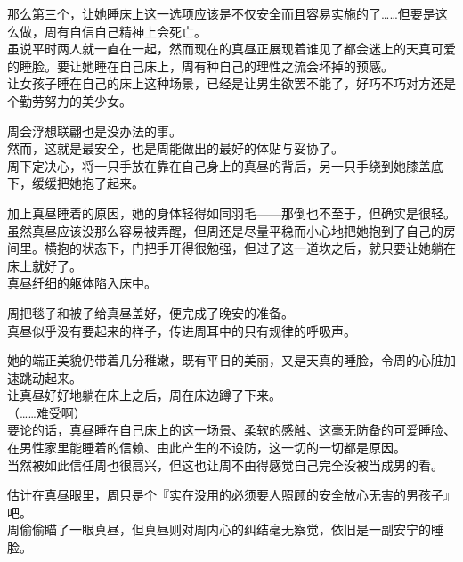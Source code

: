 那么第三个，让她睡床上这一选项应该是不仅安全而且容易实施的了……但要是这么做，周有自信自己精神上会死亡。\\

虽说平时两人就一直在一起，然而现在的真昼正展现着谁见了都会迷上的天真可爱的睡脸。要让她睡在自己床上，周有种自己的理性之流会坏掉的预感。\\

让女孩子睡在自己的床上这种场景，已经是让男生欲罢不能了，好巧不巧对方还是个勤劳努力的美少女。

周会浮想联翩也是没办法的事。\\

然而，这就是最安全，也是周能做出的最好的体贴与妥协了。\\

周下定决心，将一只手放在靠在自己身上的真昼的背后，另一只手绕到她膝盖底下，缓缓把她抱了起来。

加上真昼睡着的原因，她的身体轻得如同羽毛——那倒也不至于，但确实是很轻。\\

虽然真昼应该没那么容易被弄醒，但周还是尽量平稳而小心地把她抱到了自己的房间里。横抱的状态下，门把手开得很勉强，但过了这一道坎之后，就只要让她躺在床上就好了。\\

真昼纤细的躯体陷入床中。

周把毯子和被子给真昼盖好，便完成了晚安的准备。\\

真昼似乎没有要起来的样子，传进周耳中的只有规律的呼吸声。

她的端正美貌仍带着几分稚嫩，既有平日的美丽，又是天真的睡脸，令周的心脏加速跳动起来。\\

让真昼好好地躺在床上之后，周在床边蹲了下来。\\

（……难受啊）\\

要论的话，真昼睡在自己床上的这一场景、柔软的感触、这毫无防备的可爱睡脸、在男性家里能睡着的信赖、由此产生的不设防，这一切的一切都是原因。\\

当然被如此信任周也很高兴，但这也让周不由得感觉自己完全没被当成男的看。

估计在真昼眼里，周只是个『实在没用的必须要人照顾的安全放心无害的男孩子』吧。\\

周偷偷瞄了一眼真昼，但真昼则对周内心的纠结毫无察觉，依旧是一副安宁的睡脸。\\

